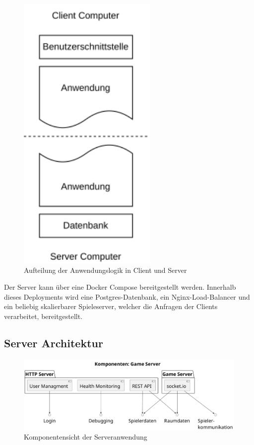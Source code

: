 \documentclass[
]{article}
\begin{document}
\begin{figure}[H]
	\centering
	\includegraphics[width=0.6\textwidth ]{resources/server_client.pdf}
	\caption{Aufteilung der Anwendungslogik in Client und Server}
	\label{fig:destribution-of-logic}
\end{figure}

Der Server kann über eine Docker Compose bereitgestellt werden.
Innerhalb dieses Deployments wird eine Postgres-Datenbank, 
ein Nginx-Load-Balancer und ein beliebig skalierbarer Spieleserver, welcher die Anfragen der Clients verarbeitet, bereitgestellt.



\subsection{Server Architektur}
\begin{figure}[H]
	\centering
	\includegraphics[width=\textwidth ]{resources/game_server.pdf}
	\caption{Komponentensicht der Serveranwendung}
	\label{fig:server}
\end{figure}
\end{document}
